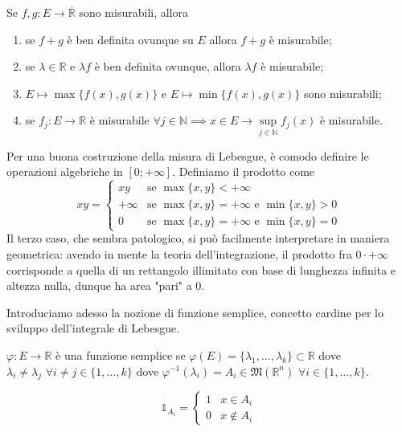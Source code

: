\begin{prop}
	Se $f, g: E \to \bar{\mathbb{R}}$ sono misurabili, allora
	\begin{enumerate}[label=\protect\circled{\arabic*}]
		\item se $f+g$ è ben definita ovunque su $E$ allora $f+g$ è misurabile;
		\item se $\lambda \in \mathbb{R}$ e $\lambda f$ è ben definita ovunque, allora $\lambda f$ è misurabile;
		\item $E \mapsto \max\{f(x), g(x) \}$ e $E \mapsto \min\{f(x),g(x) \}$ sono misurabili;
		\item se $f_j: E \to \mathbb{R}$ è misurabile $\forall j \in \mathbb{N} \implies x \in E \to \sup\limits_{j \in \mathbb{N}} f_j(x)$ è misurabile.
	\end{enumerate}
	\label{prop:f_g_mis}
\end{prop}
\begin{remark}
	Per una buona costruzione della misura di Lebesgue, è comodo definire le operazioni algebriche in $[0; +\infty]$. Definiamo il prodotto come
	\begin{equation*}
		xy = \begin{cases}
			xy & \text{se } \max\{x, y \} < +\infty \\
			+\infty & \text{se } \max\{x, y \} = +\infty \text{ e } \min\{x, y \} > 0 \\
			0 & \text{se } \max\{x, y \} = +\infty \text{ e } \min\{x, y \} = 0
		\end{cases}
	\end{equation*}
	Il terzo caso, che sembra patologico, si può facilmente interpretare in maniera geometrica: avendo in mente la teoria dell'integrazione, il prodotto fra $0 \cdot +\infty$ corrisponde a quella di un rettangolo illimitato con base di lunghezza infinita e
	altezza nulla, dunque ha area "pari" a 0.
\end{remark}
Introduciamo adesso la nozione di funzione semplice, concetto cardine per lo sviluppo dell'integrale di Lebesgue.
\begin{definition}
	$\varphi: E \to \mathbb{R}$ è una funzione semplice se $\varphi(E)=\{\lambda_1, \ldots, \lambda_k \} \subset \mathbb{R}$ dove $\lambda_i \neq \lambda_j \, \, \forall i \neq j \in \{1, \ldots, k \}$ dove
	$\varphi^{-1}(\lambda_i) = A_i \in \mathfrak{M}(\mathbb{R}^n) \, \, \forall i \in \{1, \ldots, k \}$.
\end{definition}
\begin{definition}
	$$
		\mathbb{1}_{A_i} = \begin{cases} 1 & x \in A_i \\ 0 & x \not\in A_i \end{cases}
	$$
\end{definition}
